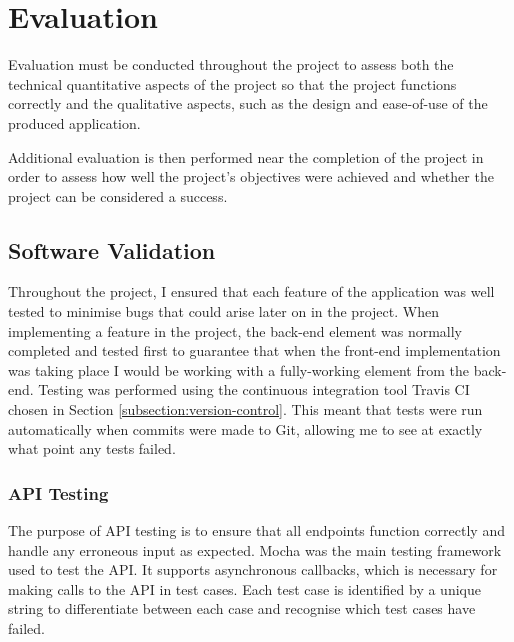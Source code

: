 \chapter{Evaluation} \label{chapter:evaluation}

Evaluation must be conducted throughout the project to assess both the technical quantitative aspects of the project so that the project functions correctly and the qualitative aspects, such as the design and ease-of-use of the produced application.

Additional evaluation is then performed near the completion of the project in order to assess how well the project's objectives were achieved and whether the project can be considered a success.

%

\section{Software Validation}

Throughout the project, I ensured that each feature of the application was well tested to minimise bugs that could arise later on in the project. When implementing a feature in the project, the back-end element was normally completed and tested first to guarantee that when the front-end implementation was taking place I would be working with a fully-working element from the back-end. Testing was performed using the continuous integration tool Travis CI chosen in Section \ref{subsection:version-control}. This meant that tests were run automatically when commits were made to Git, allowing me to see at exactly what point any tests failed.

\subsection{API Testing}

The purpose of API testing is to ensure that all endpoints function correctly and handle any erroneous input as expected. Mocha \cite{Mocha} was the main testing framework used to test the API. It supports asynchronous callbacks, which is necessary for making calls to the API in test cases. Each test case is identified by a unique string to differentiate between each case and recognise which test cases have failed.

